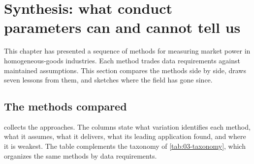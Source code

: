 \section{Synthesis: what conduct parameters can and cannot tell us}\label{sec:03-synthesis}

This chapter has presented a sequence of methods for measuring market power in homogeneous-goods industries. Each
method trades data requirements against maintained assumptions. This section compares the methods side by side, draws
seven lessons from them, and sketches where the field has gone since.

\subsection{The methods compared}\label{sec:03-synthesis-methods}

 collects the approaches. The columns state what variation identifies each method, what it
assumes, what it delivers, what its leading application found, and where it is weakest. The table complements the
taxonomy of \cref{tab:03-taxonomy}, which organizes the same methods by data requirements.

